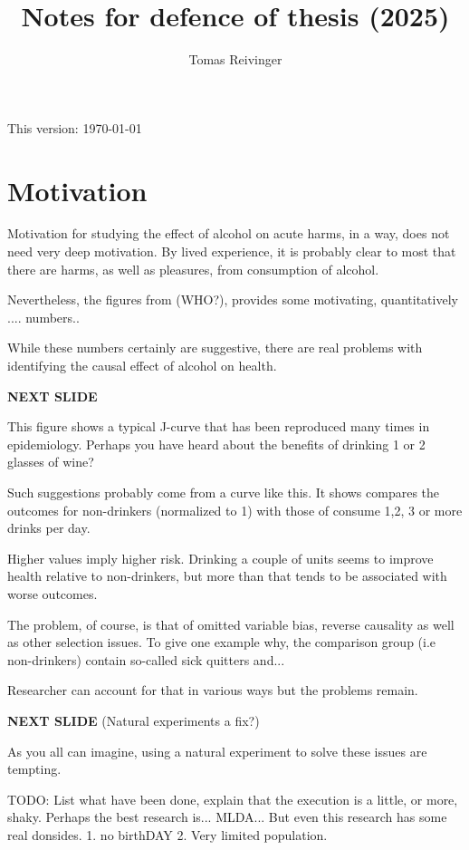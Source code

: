\documentclass[12pt]{article}
\title{Notes for defence of thesis (2025)}
\date{}
\author{Tomas Reivinger}
\begin{document}
\maketitle
\thispagestyle{empty} %
\begin{center} This version: \today\end{center}

\section{Motivation}
Motivation for studying the effect of alcohol on acute harms, in a way, does not need very deep motivation. By lived experience, it is probably clear to most that there are harms, as well as pleasures, from consumption of alcohol.

Nevertheless, the figures from (WHO?), provides some motivating, quantitatively .... numbers..

While these numbers certainly are suggestive, there are real problems with identifying the causal effect of alcohol on health.

\medskip
\textbf{NEXT SLIDE}
\medskip

This figure shows a typical J-curve that has been reproduced many times in epidemiology. Perhaps you have heard about the benefits of drinking 1 or 2 glasses of wine? 

Such suggestions probably come from a curve like this. It shows compares the outcomes for non-drinkers (normalized to 1) with those of consume 1,2, 3 or more drinks per day. 

Higher values imply higher risk. Drinking a couple of units seems to improve health relative to non-drinkers, but more than that tends to be associated with worse outcomes.

The problem, of course, is that of omitted variable bias, reverse causality as well as other selection issues. To give one example why, the comparison group (i.e non-drinkers) contain so-called sick quitters and...

Researcher can account for that in various ways but the problems remain.

\medskip
\textbf{NEXT SLIDE} (Natural experiments a fix?)
\medskip 

As you all can imagine, using a natural experiment to solve these issues are tempting. 

TODO: List what have been done, explain that the execution is a little, or more, shaky. Perhaps the best research is... MLDA... But even this research has some real donsides. 1. no birthDAY 2. Very limited population.
\end{document}

